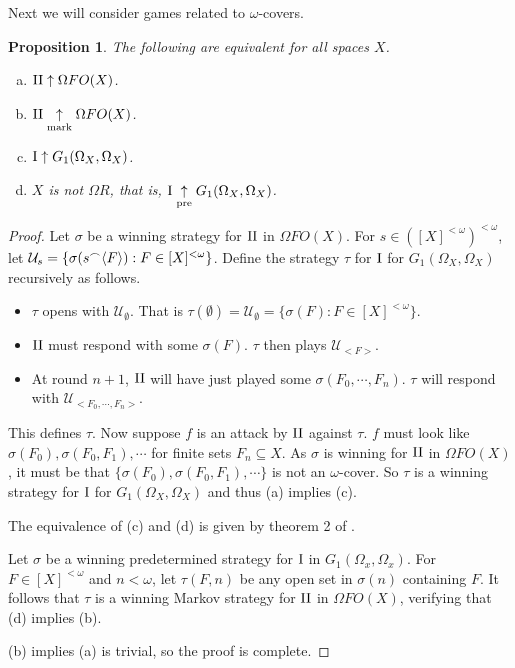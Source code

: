 \documentclass{amsart}
\theoremstyle{plain}
\newtheorem{proposition}[theorem]{Proposition}
\theoremstyle{definition}
\theoremstyle{remark}
\theoremstyle{plain}
\theoremstyle{definition}
\theoremstyle{remark}
\begin{document}
Next we will consider games related to \(\omega\)-covers.

\begin{proposition}
The following are equivalent for all spaces \(X\).
 \begin{enumerate}[a)]
  \item \(\mathrm{II}\uparrow \Omega FO(X)\).
  \item \(\mathrm{II}\underset{\text{mark}}{\uparrow} \Omega FO(X)\).
  \item \(\mathrm{I}\uparrow G_1(\Omega_X,\Omega_X)\).
  \item \(X\) is not \(\Omega R\), that is, \(\mathrm{I}\underset{\text{pre}}{\uparrow} G_1(\Omega_X,\Omega_X)\).
 \end{enumerate}
\end{proposition}
\begin{proof}
 Let \(\sigma\) be a winning strategy for \(\mathrm{II}\) in \(\Omega FO(X)\).
 For \(s\in([X]^{<\omega})^{<\omega}\), let \(\mathcal{U}_s=\{\sigma(s{^\frown}\langle F\rangle):F\in[X]^{<\omega}\}\). 
 Define the strategy \(\tau\) for \(\mathrm{I}\) for \(G_1(\Omega_X,\Omega_X)\) recursively as follows.
 \begin{itemize}
     \item \(\tau\) opens with \(\mathcal{U}_\emptyset\). 
     That is \(\tau(\emptyset) = \mathcal{U}_\emptyset = \{\sigma(F) : F \in [X]^{<\omega}\}\).
     \item \(\mathrm{II}\) must respond with some \(\sigma(F)\). \(\tau\) then plays \(\mathcal{U}_{<F>}\).
     \item At round \(n+1\), \(\mathrm{II}\) will have just played some \(\sigma(F_0,\cdots,F_n)\). \(\tau\) will respond with \(\mathcal{U}_{<F_0,\cdots,F_n>}\).
 \end{itemize}
 This defines \(\tau\).
 Now suppose \(f\) is an attack by \(\mathrm{II}\) against \(\tau\).
 \(f\) must look like \(\sigma(F_0),\sigma(F_0,F_1),\cdots\) for finite sets \(F_n \subseteq X\).
 As \(\sigma\) is winning for \(\mathrm{II}\) in \(\Omega FO(X)\), it must be that \(\{\sigma(F_0),\sigma(F_0,F_1),\cdots\}\) is not an \(\omega\)-cover.
 So \(\tau\) is a winning strategy for \(\mathrm{I}\) for \(G_1(\Omega_X,\Omega_X)\) and thus (a) implies (c).

 The equivalence of (c) and (d) is given by theorem 2 of \cite{Scheepers1997}.

 Let \(\sigma\) be a winning predetermined strategy for \(\mathrm{I}\) in \(G_1(\Omega_x,\Omega_x)\). For \(F\in[X]^{<\omega}\) and \(n<\omega\), let \(\tau(F,n)\) be any open set in \(\sigma(n)\) containing \(F\). 
 It follows that \(\tau\) is a winning Markov strategy for \(\mathrm{II}\) in \(\Omega FO(X)\), verifying that (d) implies (b).

 (b) implies (a) is trivial, so the proof is complete.
\end{proof}
\end{document}
